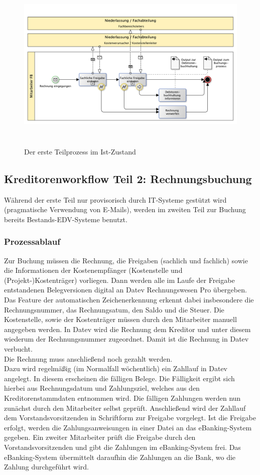 \begin{figure}[!htb]
\centering
\includegraphics[height=85mm]{images/Prozess_Ist_1_Simpel.pdf}
\caption[Teilprozess 1 im Ist-Zustand, BPMN simpel]{Der erste Teilprozess im Ist-Zustand \protect\footnotemark}
\label{Teilprozess 1 im Ist-Zustand, BPMN simpel}
\end{figure}

\subsection{Kreditorenworkflow Teil 2: Rechnungsbuchung}
Während der erste Teil nur provisorisch durch IT-Systeme gestützt wird (pragmatische Verwendung von E-Mails), werden im zweiten Teil zur Buchung bereits Bestands-EDV-Systeme benutzt.
\subsubsection{Prozessablauf}
Zur Buchung müssen die Rechnung, die Freigaben (sachlich und fachlich) sowie die Informationen der Kostenempfänger (Kostenstelle und (Projekt-)Kostenträger) vorliegen.
Dann werden alle im Laufe der Freigabe entstandenen Belegversionen digital an Datev Rechnungswesen Pro übergeben.
Das Feature der automatischen Zeichenerkennung erkennt dabei insbesondere die Rechnungsnummer, das Rechnungsatum, den Saldo und die Steuer.
Die Kostenstelle, sowie der Kostenträger müssen durch den Mitarbeiter manuell angegeben werden.
In Datev wird die Rechnung dem Kreditor und unter diesem wiederum der Rechnungsnummer zugeordnet.
Damit ist die Rechnung in Datev verbucht.\\
Die Rechnung muss anschließend noch gezahlt werden.\\
Dazu wird regelmäßig (im Normalfall wöchentlich) ein Zahllauf in Datev angelegt.
In diesem erscheinen die fälligen Belege. 
Die Fälligkeit ergibt sich hierbei aus Rechnungsdatum und Zahlungsziel, welches aus den Kreditorenstammdaten entnommen wird.
Die fälligen Zahlungen werden nun zunächst durch den Mitarbeiter selbst geprüft.
Anschließend wird der Zahllauf dem Vorstandsvorsitzenden in Schriftform zur Freigabe vorgelegt.
Ist die Freigabe erfolgt, werden die Zahlungsanweisungen in einer Datei an das eBanking-System gegeben.
Ein zweiter Mitarbeiter prüft die Freigabe durch den Vorstandsvorsitzenden und gibt die Zahlungen im eBanking-System frei.
Das eBanking-System übermittelt daraufhin die Zahlungen an die Bank, wo die Zahlung durchgeführt wird.

